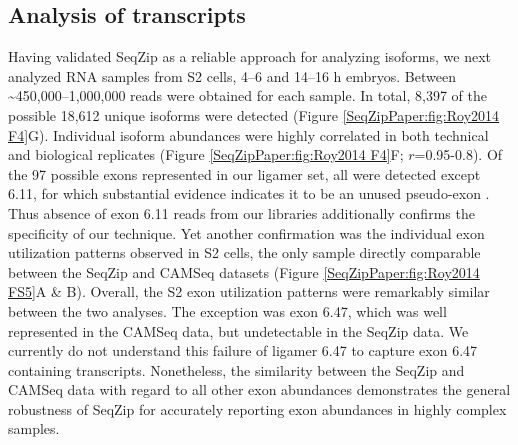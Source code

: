 	\subsection{Analysis of \dscam{} transcripts}
		\label{SeqZipPaper:subsec:SeqZip of endogenous Dscam}
	
		Having validated SeqZip as a reliable approach for analyzing \dscam{} isoforms, we next analyzed RNA samples from S2 cells, 4--6 and 14--16 h embryos. Between \textasciitilde 450,000--1,000,000 reads were obtained for each sample. In total, 8,397 of the possible 18,612 unique isoforms were detected (Figure \ref{SeqZipPaper:fig:Roy2014 F4}G). Individual isoform abundances were highly correlated in both technical and biological replicates (Figure \ref{SeqZipPaper:fig:Roy2014 F4}F; $r$=0.95-0.8). Of the 97 possible exons represented in our ligamer set, all were detected except 6.11, for which substantial evidence indicates it to be an unused pseudo-exon \citep{Neves2004,Zhan2004,Watson2005,Sun2013}. Thus absence of exon 6.11 reads from our libraries additionally confirms the specificity of our technique. Yet another confirmation was the individual exon utilization patterns observed in S2 cells, the only sample directly comparable between the SeqZip and CAMSeq datasets (Figure \ref{SeqZipPaper:fig:Roy2014 FS5}A \& B). Overall, the S2 exon utilization patterns were remarkably similar between the two analyses. The exception was exon 6.47, which was well represented in the CAMSeq data, but undetectable in the SeqZip data. We currently do not understand this failure of ligamer 6.47 to capture exon 6.47 containing transcripts. Nonetheless, the similarity between the SeqZip and CAMSeq data with regard to all other exon abundances demonstrates the general robustness of SeqZip for accurately reporting exon abundances in highly complex samples.


